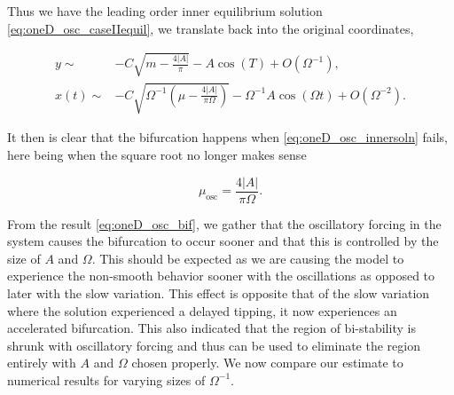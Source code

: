 Thus we have the leading order inner equilibrium solution \eqref{eq:oneD_osc_caseIIequil}, we translate back into the original coordinates,

\begin{equation}\label{eq:oneD_osc_innersoln}
\begin{aligned}
y\sim& -C\sqrt{m-\frac{4|A|}{\pi}}-A\cos(T)+O(\Omega^{-1}),\\ 
x(t)\sim& -C\sqrt{\Omega^{-1} \left(\mu-\frac{4|A|}{\pi \Omega}\right)}-\Omega^{-1} A\cos(\Omega t)+O(\Omega^{-2}).
\end{aligned}
\end{equation}

It then is clear that the bifurcation happens when \eqref{eq:oneD_osc_innersoln} fails, here being when the square root no longer makes sense

\begin{equation}\label{eq:oneD_osc_bif}
\mu_{\text{osc}}=\frac{4|A|}{\pi \Omega}.
\end{equation}

From the result \eqref{eq:oneD_osc_bif}, we gather that the oscillatory forcing in the system causes the bifurcation to occur sooner and that this is controlled by the size of $A$ and $\Omega$. This should be expected as we are causing the model to experience the non-smooth behavior sooner with the oscillations as opposed to later with the slow variation. This effect is opposite that of the slow variation where the solution experienced a delayed tipping, it now experiences an accelerated bifurcation. This also indicated that the region of bi-stability is shrunk with oscillatory forcing and thus can be used to eliminate the region entirely with $A$ and $\Omega$ chosen properly.  We now compare our estimate to numerical results for varying sizes of $\Omega^{-1}$.

